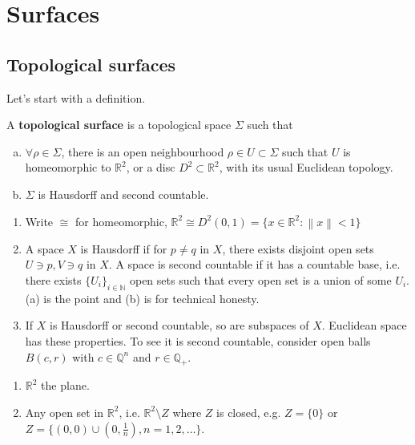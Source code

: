\documentclass[a4paper,11pt]{article}
\begin{document}
\maketitle
\tableofcontents
\clearpage

\section{Surfaces}
\subsection{Topological surfaces}
Let's start with a definition.
\begin{definition}
    A \textbf{topological surface} is a topological space $ \Sigma $ such that 
    \begin{enumerate}[(a)]
        \item $ \forall \rho\in \Sigma $, there is an open neighbourhood $\rho\in U \subset \Sigma$ such that $U$ is homeomorphic to $\mathbb{R}^2$, or a disc $D^2 \subset \mathbb{R}^{2}$, with its usual Euclidean topology. 
        \item $\Sigma$ is Hausdorff and second countable. 
    \end{enumerate}
\end{definition}
\begin{remark}
    \begin{enumerate}[(1)]
        \item Write $ \cong $ for homeomorphic, $ \mathbb{R}^{2} \cong D^2(0,1) = \{x\in \mathbb{R}^{2}: \left\| x \right\|<1\} $

        \item A space $X$ is Hausdorff if for $p\neq q$ in $X$, there exists disjoint open sets $U\ni p, V\ni q$ in $X$. 
        A space is second countable if it has a countable base, i.e. there exists $ \{U_i\}_{i\in \mathbb{N}} $ open sets such that every open set is a union of some $U_i$. (a) is the point and (b) is for technical honesty.
             
        \item If $X$ is Hausdorff or second countable, so are subspaces of $X$. Euclidean space has these properties. To see it is second countable, consider open balls $B(c,r)$ with $c\in \mathbb{Q}^n$ and $r\in \mathbb{Q}_+$. 
    \end{enumerate}
\end{remark}

\begin{example}
    \begin{enumerate}
        \item $ \mathbb{R}^{2}$ the plane. 
        \item Any open set in $ \mathbb{R}^{2}$, i.e. $ \mathbb{R}^{2}\setminus Z $ where $Z$ is closed, e.g. $ Z = \{0\} $ or $ Z = \{(0,0) \cup (0,\frac{1}{n}), n=1,2,\dots\} $. 
    \end{enumerate}
\end{example}
\end{document}
